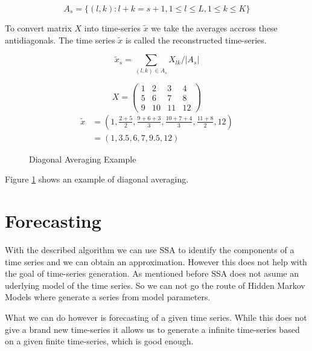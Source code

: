 \begin{equation}
A_{s}=\{(l, k): l+k=s+1,1 \leq l \leq L, 1 \leq k \leq K\}
\end{equation}

To convert matrix $X$ into time-series $\tilde{x}$ we take the averages accross these antidiagonals. The time series $\tilde{x}$ is called the reconstructed time-series. 

\begin{equation}
    \widetilde{x}_{s}=\sum_{(l, k) \in A_{s}} X_{l k} /\left|A_{s}\right|
\end{equation}


\begin{figure}
   \begin{equation*}
      X = 
      \begin{pmatrix}
         1 & 2 & 3 & 4 \\
         5 & 6 & 7 & 8 \\
         9 & 10 & 11 & 12
      \end{pmatrix}
   \end{equation*}
   \begin{equation*}
      \begin{aligned}
      \widetilde{x} &= (1, \frac{2+5}{2}, \frac{9 + 6 + 3}{3}, \frac{10 + 7 + 4}{3}, \frac{11 + 8}{2}, 12) \\
      &= (1, 3.5, 6, 7, 9.5, 12)
      \end{aligned}
   \end{equation*}
\caption{Diagonal Averaging Example}
\label{fig:diagonal-averaging}
\end{figure}

Figure \ref{fig:diagonal-averaging} shows an example of diagonal averaging. 

\section{Forecasting}

With the described algorithm we can use SSA to identify the components of a time series and we can obtain an approximation. However this does not help with the goal of time-series generation. As mentioned before SSA does not asume an uderlying model of the time series. So we can not go the route of Hidden Markov Models where generate a series from model parameters. 

What we can do however is forecasting of a given time series. While this does not give a brand new time-series it allows us to generate a infinite time-series based on a given finite time-series, which is good enough. 

